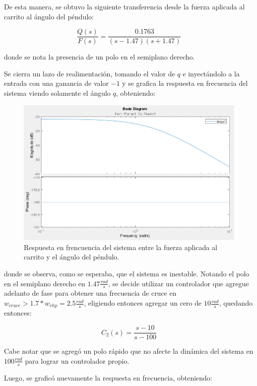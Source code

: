 De esta manera, se obtuvo la siguiente transferencia desde la fuerza aplicada al carrito al ángulo del péndulo:

\begin{equation}
\frac{Q(s)}{F(s)} = \frac{0.1763}{(s-1.47)(s+1.47)}
\end{equation}

donde se nota la presencia de un polo en el semiplano derecho.

Se cierra un lazo de realimentación, tomando el valor de $q$ e inyectándolo a la entrada con una ganancia de valor $-1$ y se grafica la respuesta en frecuencia del sistema viendo solamente el ángulo $q$, obteniendo:

\begin{figure}[H]
	\centering
	\includegraphics[width=0.8\linewidth]{Imagenes/loopshaping/bode_cerrando_q}
	\caption{Respuesta en frencuencia del sistema entre la fuerza aplicada al carrito y el ángulo del péndulo.}
	\label{bode_cerrando_q}
\end{figure}

donde se observa, como se esperaba, que el sistema es inestable. Notando el polo en el semiplano derecho en $1.47 \frac{rad}{s}$, se decide utilizar un controlador que agregue adelanto de fase para obtener una frecuencia de cruce en $w_{cruce} > 1.7 * w_{rhp} = 2.5 \frac{rad}{s}$, eligiendo entonces agregar un cero de $10 \frac{rad}{s}$, quedando entonces:

\begin{equation}
C_2(s) = \frac{s-10}{s-100}
\end{equation} 

Cabe notar que se agregó un polo rápido que no afecte la dinámica del sistema en $100 \frac{rad}{s}$ para lograr un controlador propio.

Luego, se graficó nuevamente la respuesta en frecuencia, obteniendo:

